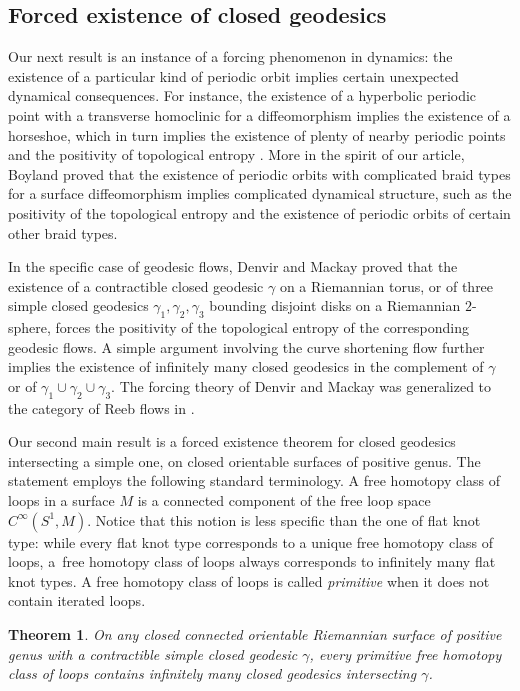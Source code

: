 \documentclass[11pt]{article}
\theoremstyle{plain}
\newtheorem{MainThm}{Theorem}
\theoremstyle{definition}
\begin{document}
\subsection{Forced existence of closed geodesics}

Our next result is an instance of a forcing phenomenon in dynamics: the existence of a particular kind of periodic orbit implies certain unexpected dynamical consequences. For instance, the existence of a hyperbolic periodic point with a transverse homoclinic for a diffeomorphism implies the existence of a horseshoe, which in turn implies the existence of plenty of nearby periodic points and the positivity of topological entropy \cite[Th.\,6.5.5]{Katok:1995aa}. More in the spirit of our article, Boyland \cite{Boyland:1994aa} proved that the existence of periodic orbits with complicated braid types for a surface diffeomorphism implies complicated dynamical structure, such as the positivity of the topological entropy and the existence of periodic orbits of certain other braid types.

In the specific case of geodesic flows, Denvir and Mackay \cite{Denvir:1998aa} proved that the existence of a contractible closed geodesic $\gamma$ on a Riemannian torus, or of three simple closed geodesics $\gamma_1,\gamma_2,\gamma_3$ bounding disjoint disks on a Riemannian $2$-sphere, forces the positivity of the topological entropy of the corresponding geodesic flows. A simple argument involving the curve shortening flow further implies the existence of infinitely many closed geodesics in the complement of $\gamma$ or of $\gamma_1\cup\gamma_2\cup\gamma_3$. The forcing theory of Denvir and Mackay was generalized to the category of Reeb flows in \cite{Alves:2022ab,Pirnapasov:2021}.

Our second main result is a forced existence theorem for closed geodesics intersecting a simple one, on closed orientable surfaces of positive genus. The statement employs the following standard terminology.
A free homotopy class of loops in a surface $M$ is a connected component of the free loop space $C^\infty(S^1,M)$. Notice that this notion is less specific than the one of flat knot type: while every flat knot type corresponds to a unique free homotopy class of loops, a~free homotopy class of loops always corresponds to infinitely many flat knot types.
A free homotopy class of loops is called \emph{primitive} when it does not contain iterated loops.

\begin{MainThm}\label{mt:multiplicity}
On any closed connected orientable Riemannian surface of positive genus with a contractible simple closed geodesic $\gamma$, every primitive free homotopy class of loops contains infinitely many closed geodesics intersecting $\gamma$.
\end{MainThm}
\end{document}
